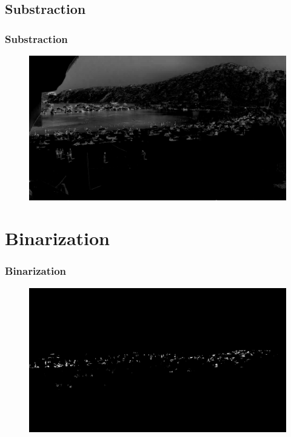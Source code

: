 \documentclass{beamer}
\begin{document}
\subsection*{Substraction}
\begin{frame}
    \frametitle{Substraction}
    \begin{figure}
        \centering
        \includegraphics[width=\textwidth]{../gen/sub/1660305600.jpg}
    \end{figure}
\end{frame}

\section{Binarization}
\begin{frame}
    \frametitle{Binarization}
    \begin{figure}
        \centering
        \includegraphics[width=\textwidth]{../gen/bin/1660305600.jpg}
    \end{figure}
\end{frame}
\end{document}
